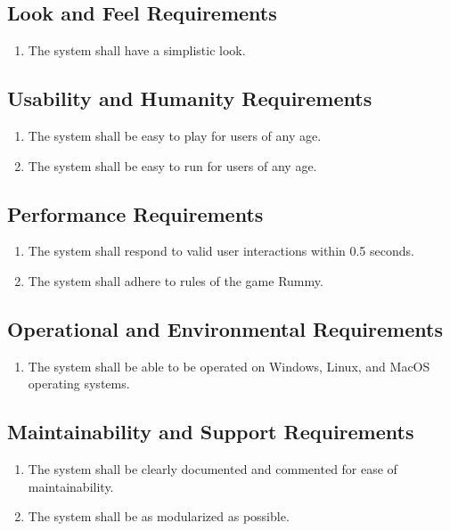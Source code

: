 \documentclass[12pt, titlepage]{article}
\begin{document}
\subsection{Look and Feel Requirements}
\begin{enumerate}[{LF}.1]
    \item The system shall have a simplistic look.
\end{enumerate}

\subsection{Usability and Humanity Requirements}
\begin{enumerate}[{UH}.1]
    \item The system shall be easy to play for users of any age.
    \item The system shall be easy to run for users of any age.
\end{enumerate}

\subsection{Performance Requirements}
\begin{enumerate}[{P}.1]
    \item The system shall respond to valid user interactions within 0.5 seconds.
    \item The system shall adhere to rules of the game Rummy.
\end{enumerate}

\subsection{Operational and Environmental Requirements}
\begin{enumerate}[{OE}.1]
    \item The system shall be able to be operated on Windows, Linux, and MacOS operating systems.
\end{enumerate}

\subsection{Maintainability and Support Requirements}
\begin{enumerate}[{MS}.1]
    \item The system shall be clearly documented and commented for ease of maintainability.
    \item The system shall be as modularized as possible.
\end{enumerate}
\end{document}
